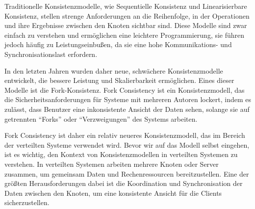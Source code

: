 \documentclass[../vs-script-first-v01.tex]{subfiles}
\begin{document}
Traditionelle Konsistenzmodelle, wie Sequentielle Konsistenz und Linearisierbare Konsistenz, stellen strenge Anforderungen an die Reihenfolge, in der Operationen und ihre Ergebnisse zwischen den Knoten sichtbar sind. Diese Modelle sind zwar einfach zu verstehen und ermöglichen eine leichtere Programmierung, sie führen jedoch häufig zu Leistungseinbußen, da sie eine hohe Kommunikations- und Synchronisationslast erfordern.


In den letzten Jahren wurden daher neue, schwächere Konsistenzmodelle entwickelt, die bessere Leistung und Skalierbarkeit ermöglichen. Eines dieser Modelle ist die Fork-Konsistenz. Fork Consistency ist ein Konsistenzmodell, das die Sicherheitsanforderungen für Systeme mit mehreren Autoren lockert, indem es zulässt, dass Benutzer eine inkonsistente Ansicht der Daten sehen, solange sie auf getrennten \enquote{Forks} oder \enquote{Verzweigungen} des Systems arbeiten.


Fork Consistency ist daher  ein relativ neueres Konsistenzmodell, das im Bereich der verteilten Systeme verwendet wird. Bevor wir auf das Modell selbst eingehen, ist es wichtig, den Kontext von Konsistenzmodellen in verteilten Systemen zu verstehen. In verteilten Systemen arbeiten mehrere Knoten oder Server zusammen, um gemeinsam Daten und Rechenressourcen bereitzustellen. Eine der größten Herausforderungen dabei ist die Koordination und Synchronisation der Daten zwischen den Knoten, um eine konsistente Ansicht für die Clients sicherzustellen.
\end{document}
